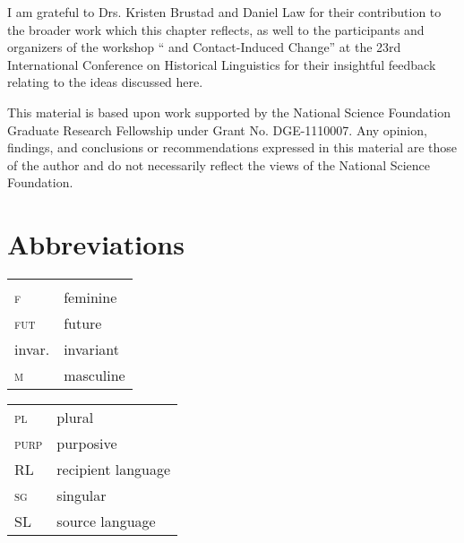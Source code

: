 \documentclass[output=paper]{langsci/langscibook}
\begin{document}
I am grateful to Drs. Kristen Brustad and Daniel Law for their contribution to the broader work which this chapter reflects, as well to the participants and organizers of the workshop “ and Contact-Induced Change” at the 23rd International Conference on Historical Linguistics for their insightful feedback relating to the ideas discussed here.

This material is based upon work supported by the National Science Foundation Graduate Research Fellowship under Grant No. DGE-1110007. Any opinion, findings, and conclusions or recommendations expressed in this material are those of the author and do not necessarily reflect the views of the National Science Foundation.

\section*{Abbreviations}
\begin{tabularx}{.6\textwidth}{@{}lQ@{}}
 &  \\
\textsc{f} & feminine \\
\textsc{fut} & {future} \\
invar. & invariant \\
\textsc{m} & masculine \\
\end{tabularx}%
\begin{tabularx}{.5\textwidth}{@{}lQ@{}}
\textsc{pl} & plural \\
\textsc{purp} & purposive \\
{RL} & {recipient language} \\
\textsc{sg} & singular \\
{SL} & {source language} \\
\end{tabularx}%

\sloppy
\printbibliography[heading=subbibliography,notkeyword=this] 
\end{document}
